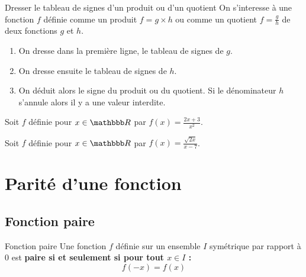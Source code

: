 \documentclass[10pt,a4paper,openany,twoside,prof]{book}
\begin{document}
\begin{methode}{Dresser le tableau de signes d'un produit ou d'un quotient}{}
    On s'interesse à une fonction $f$ définie comme un produit $f=g\times h$ ou comme un quotient $f=\frac{g}{h}$ de deux fonctions $g$ et $h$.

    \begin{enumerate}
        \item On dresse dans la première ligne, le tableau de signes de $g$.
        \item On dresse ensuite le tableau de signes de $h$.
        \item On déduit alors le signe du produit ou du quotient. Si le dénominateur $h$ s'annule alors il y a une valeur interdite.
    \end{enumerate}
\end{methode}

\begin{ex}{}{}
  Soit $f$ définie pour $x\in\R$ par $f(x) = \frac{2x+3}{x^2}$.

\end{ex}

\begin{ex}{}{}
  Soit $f$ définie pour $x\in\R$ par $f(x) = \frac{\sqrt{2x}}{x-7}$.


\end{ex}

\section{Parité d'une fonction}
	\subsection{Fonction paire}

	\begin{defi}{Fonction paire}{}
	Une fonction $f$ définie sur un ensemble $I$ symétrique par rapport à $0$ est \bf{paire} si et seulement si pour tout $x \in I$ : $$f(-x)=f(x)$$
	\end{defi}
\end{document}
